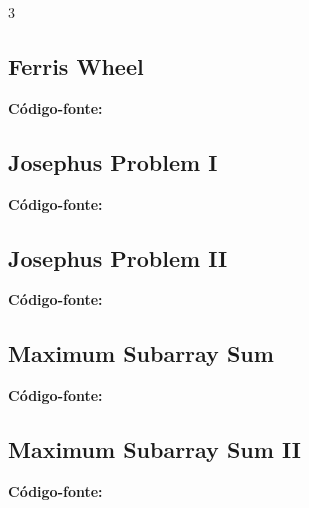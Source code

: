 \documentclass[8pt]{extarticle}
\begin{document}
\begin{multicols*}{3}
\subsection{Ferris Wheel}
\begin{caixaenunciado}

\end{caixaenunciado}
\vspace{0.3cm}
\noindent\textbf{Código-fonte:}


\subsection{Josephus Problem I}
\begin{caixaenunciado}

\end{caixaenunciado}
\vspace{0.3cm}
\noindent\textbf{Código-fonte:}


\subsection{Josephus Problem II}
\begin{caixaenunciado}

\end{caixaenunciado}
\vspace{0.3cm}
\noindent\textbf{Código-fonte:}


\subsection{Maximum Subarray Sum}
\begin{caixaenunciado}

\end{caixaenunciado}
\vspace{0.3cm}
\noindent\textbf{Código-fonte:}


\subsection{Maximum Subarray Sum II}
\begin{caixaenunciado}

\end{caixaenunciado}
\vspace{0.3cm}
\noindent\textbf{Código-fonte:}



\end{multicols*}
\end{document}
